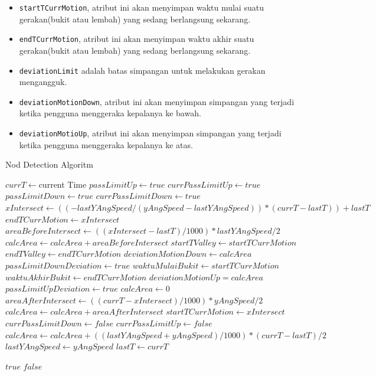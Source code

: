 \begin{itemize}
	\item \texttt{startTCurrMotion}, atribut ini akan menyimpan waktu mulai suatu gerakan(bukit atau lembah) yang sedang berlangsung sekarang.
	\item \texttt{endTCurrMotion}, atribut ini akan menyimpan waktu akhir suatu gerakan(bukit atau lembah) yang sedang berlangsung sekarang.
	\item \texttt{deviationLimit} adalah batas simpangan untuk melakukan gerakan mengangguk.
	\item \texttt{deviationMotionDown}, atribut ini akan menyimpan simpangan yang terjadi ketika pengguna menggeraka kepalanya ke bawah. 
	\item \texttt{deviationMotioUp}, atribut ini akan menyimpan simpangan yang terjadi ketika pengguna menggeraka kepalanya ke atas. 
\end{itemize}
\begin{algorithm}
	\caption{Nod Detection Algoritm}
	\label{alg:algoritme-pendeteksi-gerakan-mengangguk}
	\begin{algorithmic}[1]
		\State $currT \gets $current Time 
			\State $passLimitUp \gets true$
			\State $currPassLimitUp \gets true$
			\State $passLimitDown \gets true$
			\State $currPassLimitDown \gets true$
		\EndIf
			\State $xIntersect \gets ((-lastYAngSpeed / (yAngSpeed - lastYAngSpeed)) * (currT - lastT))+lastT$
			\State $endTCurrMotion \gets xIntersect$
			\State $areaBeforeIntersect \gets ((xIntersect - lastT) / 1000) * lastYAngSpeed / 2$
			\State $calcArea \gets calcArea + areaBeforeIntersect$
				\State $startTValley \gets startTCurrMotion$
				\State $endTValley \gets endTCurrMotion$
				\State $deviationMotionDown \gets calcArea$
					\State $passLimitDownDeviation \gets true$
				\EndIf
				\State $waktuMulaiBukit \gets startTCurrMotion$
				\State $waktuAkhirBukit \gets endTCurrMotion$
				\State $deviationMotionUp = calcArea$
					\State $passLimitUpDeviation \gets true$
				\EndIf
			\EndIf
			\State $calcArea \gets 0$
			\State $areaAfterIntersect \gets ((currT - xIntersect) / 1000) * yAngSpeed / 2$ 
			\State $calcArea \gets calcArea + areaAfterIntersect$ 
			\State $startTCurrMotion \gets xIntersect$ 
			\State $currPassLimitDown \gets false$ 
			\State $currPassLimitUp \gets false$ 
		\Else 
			\State $calcArea \gets calcArea + ((lastYAngSpeed + yAngSpeed) / 1000) * (currT - lastT) / 2$
		\EndIf
		\State $lastYAngSpeed \gets yAngSpeed$
		\State $lastT \gets currT$
		
			\Return $true$
		\Else
			\Return $false$
		\EndIf
	\EndFunction  
	\end{algorithmic}
\end{algorithm}

